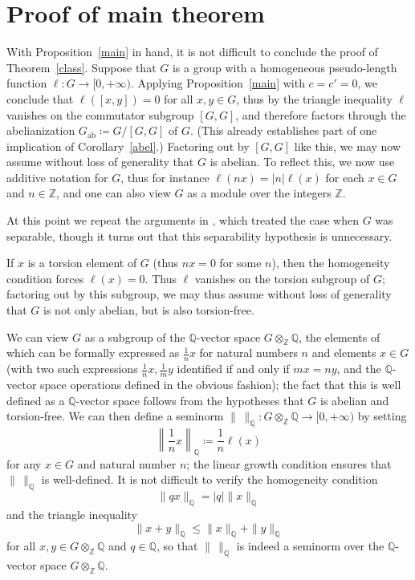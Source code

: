 \documentclass[11pt,a4paper,reqno]{amsart}
\numberwithin{equation}{section}
\theoremstyle{plain}
\theoremstyle{definition}
\newcommand\Z{\mathbb{Z}}
\newcommand\Q{\mathbb{Q}}
\newcommand\normsymb{\ell}  %
\newcommand\norm[1]{\ell({#1})}   %
\begin{document}
\section{Proof of main theorem}

With Proposition~\ref{main} in hand, it is not difficult to conclude the
proof of Theorem~\ref{class}.  Suppose that $G$ is a group with a
homogeneous pseudo-length function $\normsymb: G \to [0,+\infty)$.
Applying Proposition~\ref{main} with $c=c'=0$, we conclude that
$\norm{[x,y]}=0$ for all $x,y \in G$, thus by the triangle inequality
$\normsymb$ vanishes on the commutator subgroup $[G,G]$, and therefore
factors through the abelianization $G_{\mathrm{ab}} \coloneqq G/[G,G]$ of
$G$.  (This already establishes part of one implication of
Corollary~\ref{abel}.)  Factoring out by $[G,G]$ like this, we may now
assume without loss of generality that $G$ is abelian.  To
reflect this, we now use additive notation for $G$, thus for instance
$\norm{nx} = |n| \norm{x}$ for each $x \in G$ and $n \in \Z$, and one can
also view $G$ as a module over the integers $\Z$.

At this point we repeat the arguments in \cite[Theorem B]{KR2}, which
treated the case when $G$ was separable, though it turns out that this
separability hypothesis is unnecessary.

If $x$ is a torsion element of $G$ (thus $nx=0$ for some $n$), then the
homogeneity condition forces $\norm{x}=0$.  Thus $\normsymb$ vanishes on
the torsion subgroup of $G$; factoring out by this subgroup, we may thus
assume without loss of generality that $G$ is not only abelian, but is
also torsion-free.

We can view $G$ as a subgroup of the $\Q$-vector space $G \otimes_\Z \Q$,
the elements of which can be formally expressed as $\frac{1}{n} x$ for
natural numbers $n$ and elements $x \in G$ (with two such expressions
$\frac{1}{n} x, \frac{1}{m} y$ identified if and only if $mx = ny$, and
the $\Q$-vector space operations defined in the obvious fashion); the
fact that this is well defined as a $\Q$-vector space follows from the
hypotheses that $G$ is abelian and torsion-free.  We can then define a
seminorm $\| \, \|_\Q: G \otimes_\Z \Q \to [0,+\infty)$ by setting
\[
\left\|\frac{1}{n} x\right\|_\Q \coloneqq \frac{1}{n} \norm{x}
\]
for any $x \in G$ and natural number $n$; the linear growth condition
ensures that $\|\,\|_\Q$ is well-defined.  It is not difficult to verify
the homogeneity condition
\[
\| q x \|_\Q = |q| \|x\|_\Q
\]
and the triangle inequality
\[
\|x+y\|_\Q \leq \|x\|_\Q + \|y\|_\Q
\]
for all $x,y \in G \otimes_\Z \Q$ and $q \in \Q$, so that $\| \, \|_\Q$ is
indeed a seminorm over the $\Q$-vector space $G \otimes_\Z \Q$.
\end{document}

